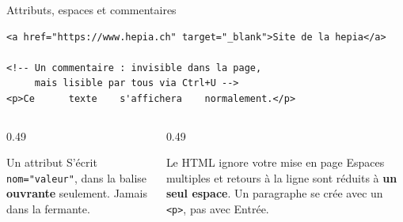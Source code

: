 \documentclass[aspectratio=169,11pt]{beamer}
\begin{document}
\begin{frame}[fragile]{Attributs, espaces et commentaires}
\begin{lstlisting}[language=HTML5]
<a href="https://www.hepia.ch" target="_blank">Site de la hepia</a>

<!-- Un commentaire : invisible dans la page,
     mais lisible par tous via Ctrl+U -->
<p>Ce      texte    s'affichera    normalement.</p>
\end{lstlisting}
  \vspace{0.2cm}
  \begin{columns}[T]
    \begin{column}{0.49\textwidth}
      \begin{block}{Un attribut}
        S'écrit \texttt{nom="valeur"}, dans la balise \textbf{ouvrante} seulement. Jamais dans la fermante.
      \end{block}
    \end{column}
    \begin{column}{0.49\textwidth}
      \begin{alertblock}{Le HTML ignore votre mise en page}
        Espaces multiples et retours à la ligne sont réduits à \textbf{un seul espace}. Un paragraphe se crée avec un \texttt{<p>}, pas avec Entrée.
      \end{alertblock}
    \end{column}
  \end{columns}
\end{frame}
\end{document}
